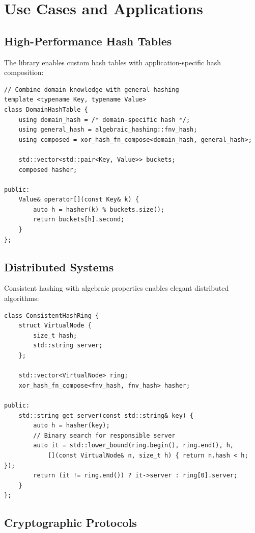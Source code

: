 \documentclass[11pt,a4paper]{article}
\theoremstyle{definition}
\begin{document}
\section{Use Cases and Applications}

\subsection{High-Performance Hash Tables}

The library enables custom hash tables with application-specific hash composition:

\begin{lstlisting}[caption={Custom hash table with composed hash function}]
// Combine domain knowledge with general hashing
template <typename Key, typename Value>
class DomainHashTable {
    using domain_hash = /* domain-specific hash */;
    using general_hash = algebraic_hashing::fnv_hash;
    using composed = xor_hash_fn_compose<domain_hash, general_hash>;

    std::vector<std::pair<Key, Value>> buckets;
    composed hasher;

public:
    Value& operator[](const Key& k) {
        auto h = hasher(k) % buckets.size();
        return buckets[h].second;
    }
};
\end{lstlisting}

\subsection{Distributed Systems}

Consistent hashing with algebraic properties enables elegant distributed algorithms:

\begin{lstlisting}[caption={Consistent hashing ring with virtual nodes}]
class ConsistentHashRing {
    struct VirtualNode {
        size_t hash;
        std::string server;
    };

    std::vector<VirtualNode> ring;
    xor_hash_fn_compose<fnv_hash, fnv_hash> hasher;

public:
    std::string get_server(const std::string& key) {
        auto h = hasher(key);
        // Binary search for responsible server
        auto it = std::lower_bound(ring.begin(), ring.end(), h,
            [](const VirtualNode& n, size_t h) { return n.hash < h; });
        return (it != ring.end()) ? it->server : ring[0].server;
    }
};
\end{lstlisting}

\subsection{Cryptographic Protocols}
\end{document}

